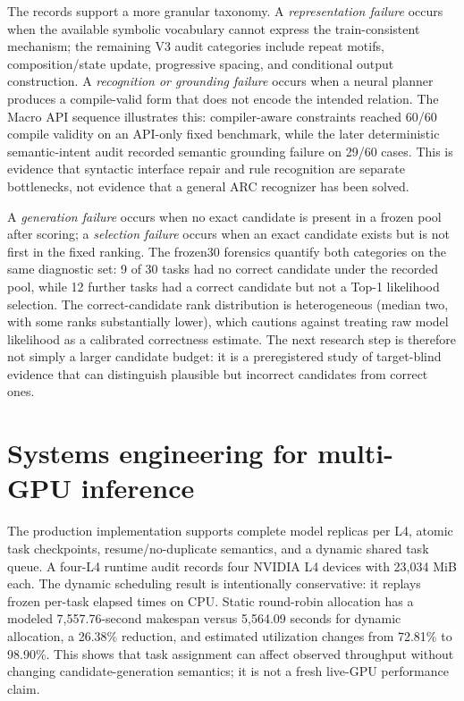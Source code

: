 \documentclass[10pt]{article}
\begin{document}
The records support a more granular taxonomy. A \emph{representation failure} occurs when the available symbolic vocabulary cannot express the train-consistent mechanism; the remaining V3 audit categories include repeat motifs, composition/state update, progressive spacing, and conditional output construction. A \emph{recognition or grounding failure} occurs when a neural planner produces a compile-valid form that does not encode the intended relation. The Macro API sequence illustrates this: compiler-aware constraints reached 60/60 compile validity on an API-only fixed benchmark, while the later deterministic semantic-intent audit recorded semantic grounding failure on 29/60 cases. This is evidence that syntactic interface repair and rule recognition are separate bottlenecks, not evidence that a general ARC recognizer has been solved.

A \emph{generation failure} occurs when no exact candidate is present in a frozen pool after scoring; a \emph{selection failure} occurs when an exact candidate exists but is not first in the fixed ranking. The frozen30 forensics quantify both categories on the same diagnostic set: 9 of 30 tasks had no correct candidate under the recorded pool, while 12 further tasks had a correct candidate but not a Top-1 likelihood selection. The correct-candidate rank distribution is heterogeneous (median two, with some ranks substantially lower), which cautions against treating raw model likelihood as a calibrated correctness estimate. The next research step is therefore not simply a larger candidate budget: it is a preregistered study of target-blind evidence that can distinguish plausible but incorrect candidates from correct ones.

\section{Systems engineering for multi-GPU inference}
The production implementation supports complete model replicas per L4, atomic task checkpoints, resume/no-duplicate semantics, and a dynamic shared task queue. A four-L4 runtime audit records four NVIDIA L4 devices with 23,034 MiB each. The dynamic scheduling result is intentionally conservative: it replays frozen per-task elapsed times on CPU. Static round-robin allocation has a modeled 7,557.76-second makespan versus 5,564.09 seconds for dynamic allocation, a 26.38\% reduction, and estimated utilization changes from 72.81\% to 98.90\%. This shows that task assignment can affect observed throughput without changing candidate-generation semantics; it is not a fresh live-GPU performance claim.
\end{document}
